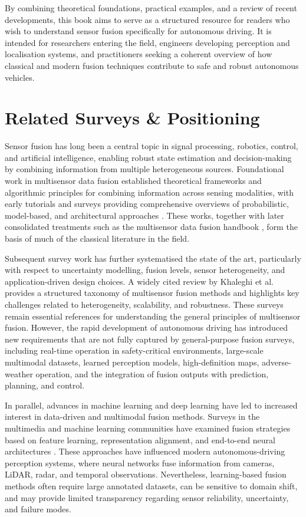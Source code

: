\documentclass[graybox,envcountchap]{style/SNmono}
\begin{document}
By combining theoretical foundations, practical examples, and a review of recent developments, this book aims to serve as a structured resource for readers who wish to understand sensor fusion specifically for autonomous driving. It is intended for researchers entering the field, engineers developing perception and localisation systems, and practitioners seeking a coherent overview of how classical and modern fusion techniques contribute to safe and robust autonomous vehicles. 

\section{Related Surveys \& Positioning}
\label{subsec:related}

Sensor fusion has long been a central topic in signal processing, robotics, control, and artificial intelligence, enabling robust state estimation and decision-making by combining information from multiple heterogeneous sources. Foundational work in multisensor data fusion established theoretical frameworks and algorithmic principles for combining information across sensing modalities, with early tutorials and surveys providing comprehensive overviews of probabilistic, model-based, and architectural approaches \cite{hall_introduction_1997, luo_multisensor_1989}. These works, together with later consolidated treatments such as the multisensor data fusion handbook \cite{liggins_handbook_2009}, form the basis of much of the classical literature in the field.

Subsequent survey work has further systematised the state of the art, particularly with respect to uncertainty modelling, fusion levels, sensor heterogeneity, and application-driven design choices. A widely cited review by Khaleghi et al. \cite{khaleghi_multisensor_2013} provides a structured taxonomy of multisensor fusion methods and highlights key challenges related to heterogeneity, scalability, and robustness. These surveys remain essential references for understanding the general principles of multisensor fusion. However, the rapid development of autonomous driving has introduced new requirements that are not fully captured by general-purpose fusion surveys, including real-time operation in safety-critical environments, large-scale multimodal datasets, learned perception models, high-definition maps, adverse-weather operation, and the integration of fusion outputs with prediction, planning, and control.

In parallel, advances in machine learning and deep learning have led to increased interest in data-driven and multimodal fusion methods. Surveys in the multimedia and machine learning communities have examined fusion strategies based on feature learning, representation alignment, and end-to-end neural architectures \cite{atrey_multimodal_2010, baltrusaitis_multimodal_2019}. These approaches have influenced modern autonomous-driving perception systems, where neural networks fuse information from cameras, LiDAR, radar, and temporal observations. Nevertheless, learning-based fusion methods often require large annotated datasets, can be sensitive to domain shift, and may provide limited transparency regarding sensor reliability, uncertainty, and failure modes.
\end{document}
